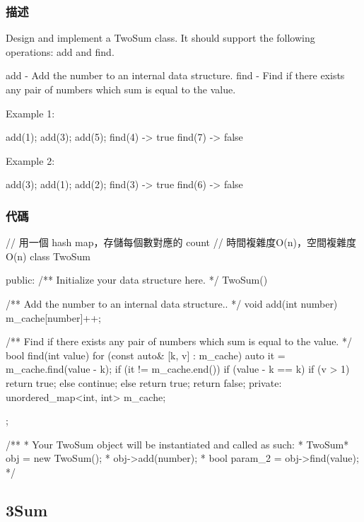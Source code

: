 \subsubsection{描述}
Design and implement a TwoSum class. It should support the following operations: add and find.

add - Add the number to an internal data structure.
find - Find if there exists any pair of numbers which sum is equal to the value.

Example 1:
\begin{Code}
add(1); add(3); add(5);
find(4) -> true
find(7) -> false
\end{Code}

Example 2:
\begin{Code}
add(3); add(1); add(2);
find(3) -> true
find(6) -> false
\end{Code}

\subsubsection{代碼}
\begin{Code}
// 用一個 hash map，存儲每個數對應的 count
// 時間複雜度O(n)，空間複雜度O(n)
class TwoSum {
public:
    /** Initialize your data structure here. */
    TwoSum() {

    }

    /** Add the number to an internal data structure.. */
    void add(int number) {
        m_cache[number]++;
    }

    /** Find if there exists any pair of numbers which sum is equal to the value. */
    bool find(int value) {
        for (const auto& [k, v] : m_cache)
        {
            auto it = m_cache.find(value - k);
            if (it != m_cache.end())
            {
                if (value - k == k)
                {
                    if (v > 1)
                        return true;
                    else
                        continue;
                }
                else
                    return true;
            }
        }
        return false;
    }
private:
    unordered_map<int, int> m_cache;
};

/**
 * Your TwoSum object will be instantiated and called as such:
 * TwoSum* obj = new TwoSum();
 * obj->add(number);
 * bool param_2 = obj->find(value);
 */
\end{Code}



\subsection{3Sum} %
\label{sec:3sum}


